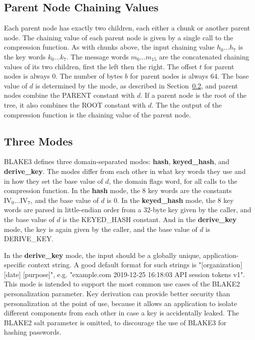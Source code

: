 \documentclass[11pt,notitlepage,a4paper]{article}
\newcommand{\IV}{\text{IV}}
\begin{document}
\subsection{Parent Node Chaining Values}\label{sec:parent}

Each parent node has exactly two children, each either a chunk or another
parent node. The chaining value of each parent node is given by a single call
to the compression function. As with chunks above, the input chaining value
$h_{0} \ldots h_{7}$ is the key words $k_{0} \ldots k_{7}$. The message words
$m_{0} \ldots m_{15}$ are the concatenated chaining values of its two children,
first the left then the right. The offset $t$ for parent nodes is always 0. The
number of bytes $b$ for parent nodes is always 64. The base value of $d$ is
determined by the mode, as described in Section~\ref{sec:modes}, and parent
nodes combine the PARENT constant with $d$. If a parent node is the root of the
tree, it also combines the ROOT constant with $d$. The the output of the
compression function is the chaining value of the parent node.

\subsection{Three Modes}\label{sec:modes}

BLAKE3 defines three domain-separated modes: \textbf{hash},
\textbf{keyed\_hash}, and \textbf{derive\_key}. The modes differ from each
other in what key words they use and in how they set the base value of $d$, the
domain flags word, for all calls to the compression function. In the
\textbf{hash} mode, the 8 key words are the constants $\IV_0 \ldots \IV_7$, and
the base value of $d$ is 0. In the \textbf{keyed\_hash} mode, the 8 key words
are parsed in little-endian order from a 32-byte key given by the caller, and
the base value of $d$ is the KEYED\_HASH constant. And in the
\textbf{derive\_key} mode, the key is again given by the caller, and the base
value of $d$ is DERIVE\_KEY.

In the \textbf{derive\_key} mode, the input should be a globally unique,
application-specific context string. A good default format for such strings is
"[organization] [date] [purpose]", e.g. "example.com 2019-12-25 16:18:03 API
session tokens v1". This mode is intended to support the most common use cases
of the BLAKE2 personalization parameter. Key derivation can provide better
security than personalization at the point of use, because it allows an
application to isolate different components from each other in case a key is
accidentally leaked. The BLAKE2 salt parameter is omitted, to discourage the
use of BLAKE3 for hashing passwords.
\end{document}
